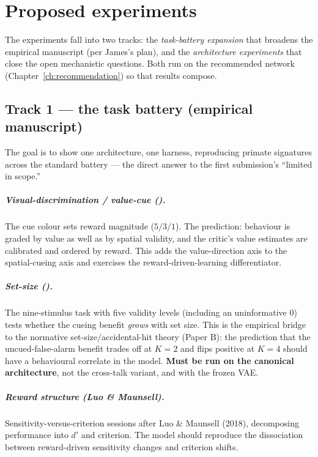 \chapter{Proposed experiments}
\label{ch:experiments}

The experiments fall into two tracks: the \emph{task-battery expansion} that broadens the
empirical manuscript (per James's plan), and the \emph{architecture experiments} that close
the open mechanistic questions. Both run on the recommended network
(Chapter~\ref{ch:recommendation}) so that results compose.

\section{Track 1 --- the task battery (empirical manuscript)}
The goal is to show one architecture, one harness, reproducing primate signatures across
the standard battery --- the direct answer to the first submission's ``limited in scope.''

\paragraph{Visual-discrimination / value-cue ().} The cue colour sets reward
magnitude ($5/3/1$). The prediction: behaviour is graded by value as well as by spatial
validity, and the critic's value estimates are calibrated and ordered by reward. This adds
the value-direction axis to the spatial-cueing axis and exercises the reward-driven-learning
differentiator.

\paragraph{Set-size ().} The nine-stimulus task with five validity
levels (including an uninformative $0$) tests whether the cueing benefit \emph{grows} with
set size. This is the empirical bridge to the normative set-size/accidental-hit theory
(Paper B): the prediction that the uncued-false-alarm benefit trades off at $K=2$ and flips
positive at $K=4$ should have a behavioural correlate in the model. \textbf{Must be run on
the canonical architecture}, not the cross-talk variant, and with the frozen VAE.

\paragraph{Reward structure (Luo \& Maunsell).} Sensitivity-versus-criterion sessions after
Luo \& Maunsell (2018), decomposing performance into $d'$ and criterion. The model should
reproduce the dissociation between reward-driven sensitivity changes and criterion shifts.

